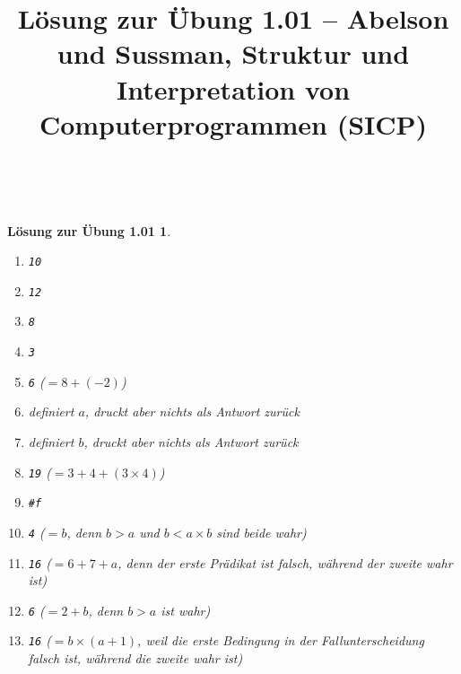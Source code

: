 \documentclass[a4paper,11pt,reqno]{amsart}
\theoremstyle{uremark}
\newtheorem*{loes}{L\"osung zur \"Ubung 1.01}
\begin{document}
\title[]{L\"osung zur \"Ubung 1.01 -- Abelson und Sussman, Struktur und
    Interpretation von Computerprogrammen (SICP)} 

\author{\href{https://github.com/pzuehlke}{}}
\maketitle
\

\begin{loes}\ 
\begin{enumerate}[label=\small$\bullet$]
    \item \texttt{10}
    \item \texttt{12}
    \item \texttt{8}
    \item \texttt{3}
    \item \texttt{6} ($ = 8  + (-2)$)
    \item definiert $ a $, druckt aber nichts als Antwort zur\"uck
    \item definiert $ b $, druckt aber nichts als Antwort zur\"uck
    \item \texttt{19} ($ = 3 + 4 + (3 \times 4) $) 
    \item \texttt{\#f}
    \item \texttt{4} ($ = b $, denn $ b > a $ und $ b < a \times b $ sind beide
            wahr)
    \item \texttt{16} ($ = 6 + 7 + a $, denn der erste Pr\"adikat ist
        falsch, w\"ahrend der zweite wahr ist)
    \item \texttt{6} ($ = 2 + b $, denn $ b > a $ ist wahr)
    \item \texttt{16} ($ = b \times (a + 1) $, weil die erste Bedingung in der
        Fallunterscheidung \ttt{cond} falsch ist, w\"ahrend die zweite wahr ist)
\end{enumerate}
\end{loes}
\end{document}
